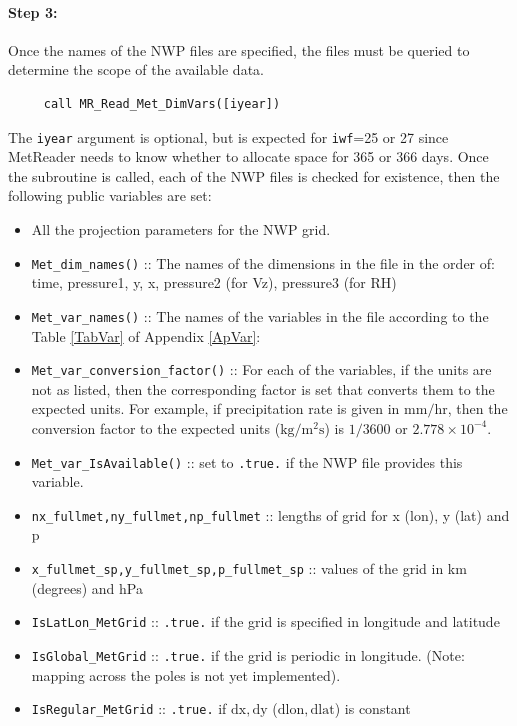\documentclass[11pt]{article}   %
\begin{document}
\paragraph{Step 3:} Once the names of the NWP files are specified, the files must
be queried to determine the scope of the available data.
\begin{verbatim}
     call MR_Read_Met_DimVars([iyear])
\end{verbatim}
The \texttt{iyear} argument is optional, but is expected for \texttt{iwf}=25 or 27
since MetReader needs to know whether to allocate space for 365 or 366 days.
Once the subroutine is called, each of the NWP files is checked for existence, then
the following public variables are set:
\begin{itemize}
\item All the projection parameters for the NWP grid.
\item \texttt{Met\_dim\_names()} :: The names of the dimensions in the file in the order of: time,
pressure1, y, x, pressure2 (for Vz), pressure3 (for RH)
\item \texttt{Met\_var\_names()} :: The names of the variables in the file according to the
Table \ref{TabVar} of Appendix \ref{ApVar}:
\item \texttt{Met\_var\_conversion\_factor()} :: For each of the variables, if the units
are not as listed, then the corresponding factor is set that converts them to the
expected units.  For example, if precipitation rate is given in $\mathrm{mm/hr}$, then
the conversion factor to the expected units ($\mathrm{kg/m^2s}$) is $1/3600$ or
$2.778 \times 10^{-4}$.
\item \texttt{Met\_var\_IsAvailable()} :: set to \texttt{.true.} if the NWP file
provides this variable.
\item \texttt{nx\_fullmet,ny\_fullmet,np\_fullmet} :: lengths of grid for x (lon), y (lat) and p
\item \texttt{x\_fullmet\_sp,y\_fullmet\_sp,p\_fullmet\_sp} :: values of the grid in km (degrees) and hPa
\item \texttt{IsLatLon\_MetGrid} :: \texttt{.true.} if the grid is specified in longitude and latitude
\item \texttt{IsGlobal\_MetGrid} :: \texttt{.true.} if the grid is periodic in longitude.  (Note:
mapping across the poles is not yet implemented).
\item \texttt{IsRegular\_MetGrid} :: \texttt{.true.} if $\mathrm{dx,dy}$ ($\mathrm{dlon,dlat}$) is constant
\end{itemize}
\end{document}
